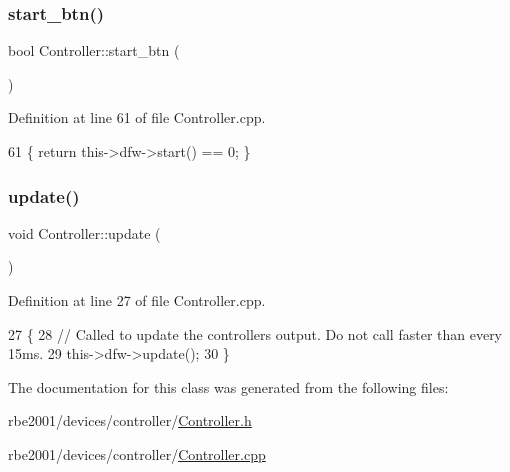 \subsubsection{\texorpdfstring{start\+\_\+btn()}{start\_btn()}}
{\footnotesize\ttfamily bool Controller\+::start\+\_\+btn (\begin{DoxyParamCaption}{ }\end{DoxyParamCaption})}



Definition at line 61 of file Controller.\+cpp.


\begin{DoxyCode}
61 \{ \textcolor{keywordflow}{return} this->dfw->start() == 0; \}
\end{DoxyCode}
\mbox{\label{class_controller_a7d04c17913f04f99429aa29fa8505484}} 
\subsubsection{\texorpdfstring{update()}{update()}}
{\footnotesize\ttfamily void Controller\+::update (\begin{DoxyParamCaption}{ }\end{DoxyParamCaption})}



Definition at line 27 of file Controller.\+cpp.


\begin{DoxyCode}
27                         \{
28     \textcolor{comment}{// Called to update the controllers output. Do not call faster than every 15ms.}
29     this->dfw->update();
30 \}
\end{DoxyCode}


The documentation for this class was generated from the following files\+:\begin{DoxyCompactItemize}
\item 
rbe2001/devices/controller/\hyperlink{_controller_8h}{Controller.\+h}\item 
rbe2001/devices/controller/\hyperlink{_controller_8cpp}{Controller.\+cpp}\end{DoxyCompactItemize}
